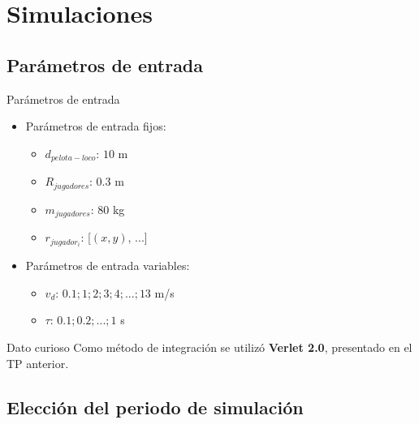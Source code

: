 \documentclass{beamer}
\begin{document}
    \section{Simulaciones}

        \subsection{Parámetros de entrada}

            \begin{frame}{Parámetros de entrada}
                \begin{itemize}
                    \item Parámetros de entrada fijos:
                    \begin{itemize}
                        \item $d_{pelota-loco}$: \alert{$10$ m}
                        \item $R_{jugadores}$: \alert{$0.3$ m}
                        \item $m_{jugadores}$: \alert{$80$ kg}
                        \item $r_{jugador_i}$: \alert{[$(x, y)$, ...]}
                    \end{itemize}
                    \item Parámetros de entrada variables:
                    \begin{itemize}
                        \item $v_d$: \alert{${0.1; 1; 2; 3; 4; ...; 13}$ m/s}
                        \item $\tau$: \alert{$0.1; 0.2; ...; 1$ s}
                    \end{itemize}
                \end{itemize}
                \begin{block}{Dato curioso}
                    Como método de integración se utilizó \textbf{Verlet 2.0}, presentado en el TP anterior.
                \end{block}
            \end{frame}

        \subsection{Elección del periodo de simulación}
\end{document}
